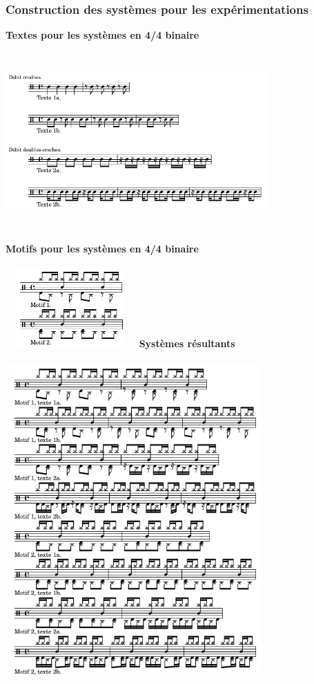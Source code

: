 \subsubsection{Construction des systèmes pour les expérimentations}
\textbf{Textes pour les systèmes en 4/4 binaire}\\\\
\includegraphics[height=65mm, width=100mm]{z_images/1_description_notation/systemes/textes_4-4_binaires.png}\\\\
\textbf{Motifs pour les systèmes en 4/4 binaire}\\\\
\includegraphics[height=30mm, width=50mm]{z_images/1_description_notation/systemes/motifs_4-4_binaires.png}\newpage
\textbf{Systèmes résultants}\\\\
\includegraphics[height=120mm, width=100mm]{z_images/3_experimentations/experience_1/systemes_recherches.png}